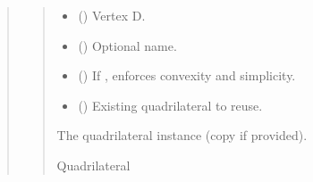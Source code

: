 \documentclass[letterpaper,10pt,english]{sphinxmanual}
\begin{document}
\begin{quote}
\begin{fulllineitems}
\begin{fulllineitems}
\begin{quote}
\begin{description}
\begin{itemize}
\item {} 
\sphinxAtStartPar
{} (\sphinxstyleliteralemphasis{\sphinxupquote{ | }}) \textendash{} Vertex D.

\item {} 
\sphinxAtStartPar
{} (\sphinxstyleliteralemphasis{\sphinxupquote{ | }}) \textendash{} Optional name.

\item {} 
\sphinxAtStartPar
{} () \textendash{} If , enforces convexity and simplicity.

\item {} 
\sphinxAtStartPar
{} (\sphinxstyleliteralemphasis{\sphinxupquote{ | }}) \textendash{} Existing quadrilateral to reuse.

\end{itemize}

\sphinxAtStartPar
The quadrilateral instance (copy if provided).

\sphinxAtStartPar
Quadrilateral

\end{description}\end{quote}

\end{fulllineitems}



\end{fulllineitems}
\end{quote}
\end{document}
